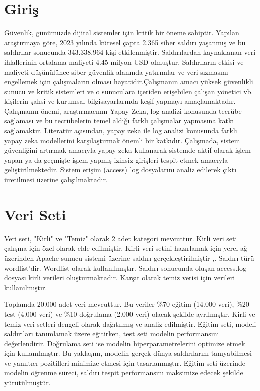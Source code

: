 \documentclass[12pt,a4paper]{article}
\begin{document}
  \newpage
	\section{Giriş}
Güvenlik, günümüzde dijital sistemler için kritik bir öneme sahiptir. Yapılan araştırmaya göre, 2023 yılında küresel çapta 2.365 siber saldırı yaşanmış ve bu saldırılar sonucunda 343.338.964 kişi etkilenmiştir. Saldırılardan kaynaklanan veri ihlallerinin ortalama maliyeti 4.45 milyon USD olmuştur. Saldırıların etkisi ve maliyeti düşünülünce siber güvenlik alanında yatırımlar ve veri sızmasını engellemek için çalışmaların olması hayatidir.\cite{Cyber_attack}\newline\newline Çalışmanın amacı yüksek güvenlikli sunucu ve kritik sistemleri ve o sunuculara içeriden erişebilen çalışan yönetici vb. kişilerin şahsi ve kurumsal bilgisayarlarında keşif yapmayı amaçlamaktadır. Çalışmanın önemi, araştırmacının Yapay Zeka, log analizi konusunda tecrübe sağlaması ve bu tecrübelerin temel aldığı farklı çalışmalar yapmasına katkı sağlamaktır. Literatür açısından, yapay zeka ile log analizi konusunda farklı yapay zeka modellerini karşılaştırmak önemli bir katkıdır. Çalışmada, sistem güvenliğini artırmak amacıyla yapay zeka kullanarak sistemde aktif olarak işlem yapan ya da geçmişte işlem yapmış izinsiz girişleri tespit etmek amacıyla geliştirilmektedir. Sistem erişim (access) log dosyalarını analiz edilerek çıktı üretilmesi üzerine çalışılmaktadır.

\section{Veri Seti}
Veri seti, "Kirli" ve "Temiz" olarak 2 adet kategori mevcuttur. Kirli veri seti çalışma için özel olarak elde edilmiştir. Kirli veri setini hazırlamak için yerel ağ üzerinden Apache sunucu sistemi üzerine saldırı gerçekleştirilmiştir \cite{Dirbuster},\cite{gobuster}. Saldırı türü wordlist'dir. Wordlist olarak \cite{big.txt} kullanılmıştır. Saldırı sonucunda oluşan access.log dosyası kirli verileri oluşturmaktadır. Karşıt olarak temiz verisi için \cite{kaggle} verileri kullanılmıştır.

Toplamda 20.000 adet veri mevcuttur. Bu veriler \%70 eğitim (14.000 veri), \%20 test (4.000 veri) ve \%10 doğrulama (2.000 veri) olacak şekilde ayrılmıştır. Kirli ve temiz veri setleri dengeli olarak dağıtılmış ve analiz edilmiştir. Eğitim seti, modeli saldırıları tanımlamak üzere eğitirken, test seti modelin performansını değerlendirir. Doğrulama seti ise modelin hiperparametrelerini optimize etmek için kullanılmıştır. Bu yaklaşım, modelin gerçek dünya saldırılarını tanıyabilmesi ve yanıltıcı pozitifleri minimize etmesi için tasarlanmıştır. Eğitim seti üzerinde modelin öğrenme süreci, saldırı tespit performansını maksimize edecek şekilde yürütülmüştür.
\end{document}
